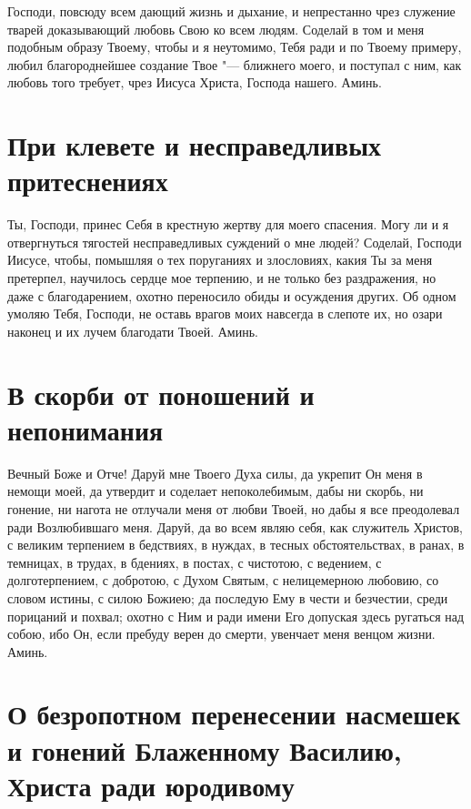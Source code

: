 Господи, повсюду всем дающий жизнь и дыхание, и непрестанно чрез служение тварей доказывающий любовь Свою ко всем людям. Соделай в том и меня подобным образу Твоему, чтобы и я неутомимо, Тебя ради и по Твоему примеру, любил благороднейшее создание Твое "--- ближнего моего, и поступал с ним, как любовь того требует, чрез Иисуса Христа, Господа нашего. Аминь.


\section{При клевете и несправедливых притеснениях}
 


Ты, Господи, принес Себя в крестную жертву для моего спасения. Могу ли и я отвергнуться тягостей несправедливых суждений о мне людей? Соделай, Господи Иисусе, чтобы, помышляя о тех поруганиях и злословиях, какия Ты за меня претерпел, научилось сердце мое терпению, и не только без раздражения, но даже с благодарением, охотно переносило обиды и осуждения других. Об одном умоляю Тебя, Господи, не оставь врагов моих навсегда в слепоте их, но озари наконец и их лучем благодати Твоей. Аминь.


\section{В скорби от поношений и непонимания}
 


Вечный Боже и Отче! Даруй мне Твоего Духа силы, да укрепит Он меня в немощи моей, да утвердит и соделает непоколебимым, дабы ни скорбь, ни гонение, ни нагота не отлучали меня от любви Твоей, но дабы я все преодолевал ради Возлюбившаго меня. Даруй, да во всем являю себя, как служитель Христов, с великим терпением в бедствиях, в нуждах, в тесных обстоятельствах, в ранах, в темницах, в трудах, в бдениях, в постах, с чистотою, с ведением, с долготерпением, с добротою, с Духом Святым, с нелицемерною любовию, со словом истины, с силою Божиею; да последую Ему в чести и безчестии, среди порицаний и похвал; охотно с Ним и ради имени Его допуская здесь ругаться над собою, ибо Он, если пребуду верен до смерти, увенчает меня венцом жизни. Аминь.


\section{О безропотном перенесении насмешек и гонений Блаженному Василию, Христа ради юродивому}
 


